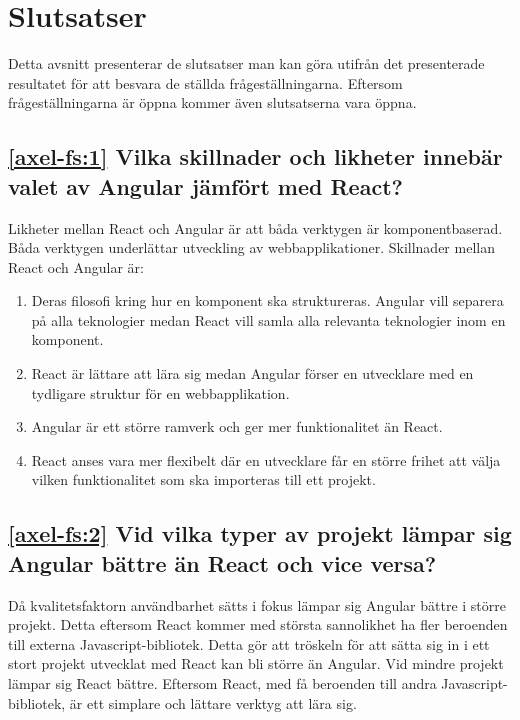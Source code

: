 \section{Slutsatser}
\label{sec:axel-conclusion}

Detta avsnitt presenterar de slutsatser man kan göra utifrån det presenterade resultatet för att besvara de ställda frågeställningarna. Eftersom frågeställningarna är öppna kommer även slutsatserna vara öppna.

\subsection*{\ref{axel-fs:1} Vilka skillnader och likheter innebär valet av Angular jämfört med React?}
Likheter mellan React och Angular är att båda verktygen är komponentbaserad. Båda verktygen underlättar utveckling av webbapplikationer. Skillnader mellan React och Angular är:
\begin{enumerate}
    \item Deras filosofi kring hur en komponent ska struktureras. Angular vill separera på alla teknologier medan React vill samla alla relevanta teknologier inom en komponent.

    \item React är lättare att lära sig medan Angular förser en utvecklare med en tydligare struktur för en webbapplikation.

    \item Angular är ett större ramverk och ger mer funktionalitet än React.

    \item React anses vara mer flexibelt där en utvecklare får en större frihet att välja vilken funktionalitet som ska importeras till ett projekt.
    
\end{enumerate}

\subsection*{\ref{axel-fs:2} Vid vilka typer av projekt lämpar sig Angular bättre än React och vice versa?}
Då kvalitetsfaktorn användbarhet sätts i fokus lämpar sig Angular bättre i större projekt. Detta eftersom React kommer med största sannolikhet ha fler beroenden till externa Javascript-bibliotek. Detta gör att tröskeln för att sätta sig in i ett stort projekt utvecklat med React kan bli större än Angular. Vid mindre projekt lämpar sig React bättre. Eftersom React, med få beroenden till andra Javascript-bibliotek, är ett simplare och lättare verktyg att lära sig.
 
